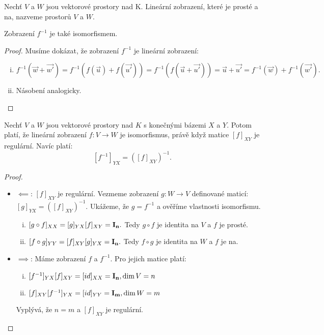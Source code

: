 \begin{definition}
    Nechť $V$ a $W$ jsou vektorové prostory nad K. Lineární zobrazení,
    které je prosté a na, nazveme  prostorů $V$ a $W$.
\end{definition}

\begin{observation}
    Zobrazení $f^{-1}$ je také isomorfismem.
\end{observation}

\begin{proof}
	Musíme dokázat, že zobrazení $f^{-1}$ je lineární zobrazení:
	\begin{enumerate}[i.]
		\item $f^{-1}(\vec{w} + \vec{w'}) = f^{-1}(f(\vec{u}) + f(\vec{u'})) = 
			f^{-1}(f(\vec{u} + \vec{u'})) = \vec{u} + \vec{u'} 
			= f^{-1}(\vec{w}) + f^{-1}(\vec{w'}).$
	    \item Násobení analogicky.
	\end{enumerate}
\end{proof}

\begin{theorem}
    Nechť $V$ a $W$ jsou vektorové prostory nad $K$ s konečnými bázemi $X$
    a $Y$. Potom platí, že lineární zobrazení $f: V \rightarrow W$ je
    isomorfismus, právě když matice $[f]_{XY}$ je regulární. Navíc platí:
    $$ [f^{-1}]_{YX} = \left([f]_{XY}\right)^{-1}.$$
\end{theorem}

\begin{proof}
    \leavevmode
    \begin{itemize}
        \item $\impliedby$: $[f]_{XY}$ je regulární. Vezmeme zobrazení 
            $g: W \rightarrow V$ definované maticí: $[g]_{YX} = 
            \left([f]_{XY}\right)^{-1}$. Ukážeme, že $g = f^{-1}$ a 
            ověříme vlastnosti isomorfismu.
            \begin{enumerate}[i.]
                \item $[g \circ f]_{XX} = [g]_{YX}[f]_{XY} = \mathbf{I_n}.$
                    Tedy $g \circ f$ je identita na $V$ a $f$ je prosté.
                \item $[f \circ g]_{YY} = [f]_{XY} [g]_{YX} = \mathbf{I_n}.$
                    Tedy $f \circ g$ je identita na $W$ a $f$ je na.
            \end{enumerate}
        \item $\implies$: Máme zobrazení $f$ a $f^{-1}$. Pro jejich matice
            platí:
            \begin{enumerate}[i.]
                \item $[f^{-1}]_{YX}[f]_{XY} = [id]_{XX} = \mathbf{I_n},
                    \mathop{\mathrm{dim}} V = n$
                \item $[f]_{XY}[f^{-1}]_{YX} = [id]_{YY} = \mathbf{I_m},
                    \mathop{\mathrm{dim}} W = m$
            \end{enumerate}
            Vyplývá, že $n = m$ a $[f]_{XY}$ je regulární.
    \end{itemize}
\end{proof}

